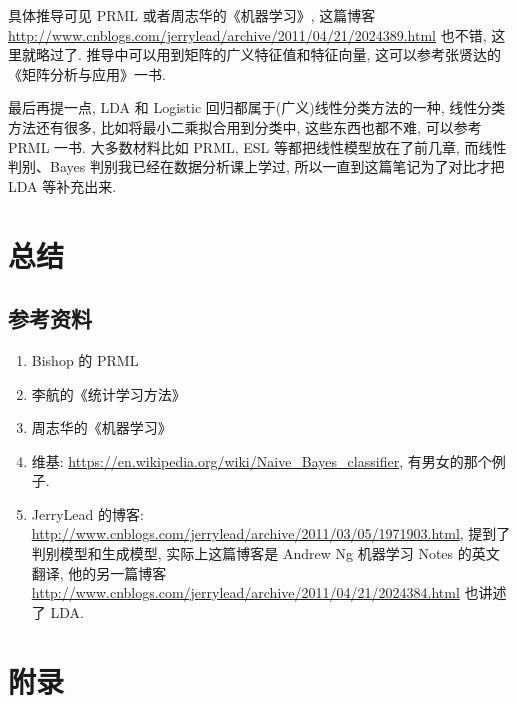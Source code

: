 \documentclass[a4paper,UTF8]{ctexart}
\theoremstyle{plain} \newtheorem{theorem}{定理}[section]
\theoremstyle{plain} \newtheorem{definition}{定义}[section]
\theoremstyle{plain} \newtheorem{lemma}{引理}[section]
\theoremstyle{plain} \newtheorem{proposition}{命题}[section]
\theoremstyle{plain} \newtheorem{example}{例}[section]
\theoremstyle{plain} \newtheorem{remark}{注}[section]
\theoremstyle{plain} \newtheorem{corollary}{推论}[section]
\begin{document}
具体推导可见 PRML 或者周志华的《机器学习》, 这篇博客 \url{http://www.cnblogs.com/jerrylead/archive/2011/04/21/2024389.html} 也不错, 这里就略过了. 推导中可以用到矩阵的广义特征值和特征向量, 这可以参考张贤达的《矩阵分析与应用》一书.

最后再提一点, LDA 和 Logistic 回归都属于(广义)线性分类方法的一种, 线性分类方法还有很多, 比如将最小二乘拟合用到分类中, 这些东西也都不难, 可以参考 PRML 一书. 大多数材料比如 PRML, ESL 等都把线性模型放在了前几章, 而线性判别、Bayes 判别我已经在数据分析课上学过, 所以一直到这篇笔记为了对比才把 LDA 等补充出来.




\section{总结}
\subsection{参考资料}
\begin{enumerate}[(1)]
\item Bishop 的 PRML

\item 李航的《统计学习方法》

\item 周志华的《机器学习》

\item 维基: \url{https://en.wikipedia.org/wiki/Naive_Bayes_classifier}, 有男女的那个例子.

\item JerryLead 的博客: \url{http://www.cnblogs.com/jerrylead/archive/2011/03/05/1971903.html}, 提到了判别模型和生成模型, 实际上这篇博客是 Andrew Ng 机器学习 Notes 的英文翻译, 他的另一篇博客 \url{http://www.cnblogs.com/jerrylead/archive/2011/04/21/2024384.html} 也讲述了 LDA.
\end{enumerate}







\newpage

\section*{附录}
\end{document}
